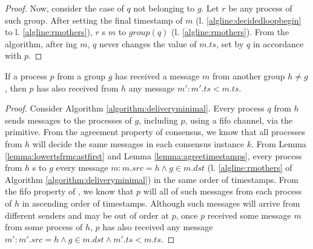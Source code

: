 \documentclass[times, 10pt]{article}
\begin{document}
\begin{proof}
Now, consider the case of $q$ not belonging to $g$. Let $r$ be any process of such group. After setting the final timestamp of $m$ (l. \ref{algline:decidedloopbegin} to l. \ref{algline:rmothers}), $r$ \rmcast{}s $m$ to $group(q)$ (l. \ref{algline:rmothers}). From the algorithm, after \rmdel{}ing $m$, $q$ never changes the value of $m.ts$, set by $q$ in accordance with $p$.%
\end{proof}






\begin{lems} \label{lemma:groupfifo}
If a process $p$ from a group $g$ has received a message $m$ from another group $h \neq g$, then $p$ has also received from $h$ any message $m' : m'.ts < m.ts$.
\end{lems}

\begin{proof}
Consider Algorithm \ref{algorithm:deliveryminimal}. Every process $q$ from $h$ sends messages to the processes of $g$, including $p$, using a fifo channel, via the \rmcast{} primitive. From the agreement property of consensus, we know that all processes from $h$ will decide the same messages in each consensus instance $k$. From Lemma \ref{lemma:lowertsfrmcastfirst} and Lemma \ref{lemma:agreetimestamps}, every process from $h$ \rmcast{}s to $g$ every message $m : m.src = h \wedge g \in m.dst$ (l. \ref{algline:rmothers} of Algorithm \ref{algorithm:deliveryminimal}) in the same order of timestamps. From the fifo property of \rmcast{}, we know that $p$ will \rmdel{} all of such messages from each process of $h$ in ascending order of timestamps. Although such messages will arrive from different senders and may be out of order at $p$, once $p$ received some message $m$ from some process of $h$, $p$ has also received any message \mbox{$m' : m'.src = h \wedge g \in m.dst\wedge m'.ts < m.ts$}.
%
\end{proof}
\end{document}

